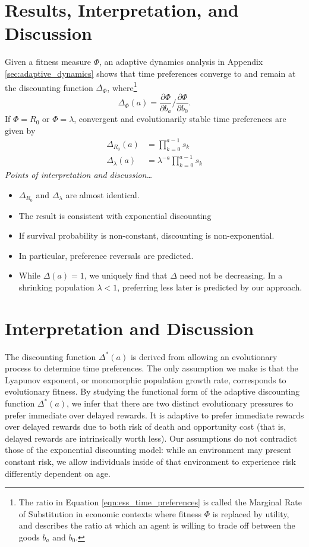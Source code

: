 \documentclass[titlepage, hidelinks, 12pt]{article}
\theoremstyle{plain}
\theoremstyle{remark}
\theoremstyle{definition}
\begin{document}
\section{Results, Interpretation, and Discussion} \label{sec:r, i, and d}
Given a fitness measure $\Phi$,
an adaptive dynamics analysis in Appendix \ref{sec:adaptive_dynamics} shows that time preferences converge to and
remain at the discounting function $\Delta_\Phi$, where\footnote{The ratio in Equation \ref{eqn:ess_time_preferences} is 
    called the Marginal Rate of Substitution in economic contexts where fitness $\Phi$ is replaced
by utility, and describes the ratio at which an agent is willing to trade off between the goods $b_a$ and $b_0$.}
\begin{equation}
    \Delta_\Phi(a) = \frac{\partial \Phi}{\partial b_a} \bigg/ \frac{\partial \Phi}{ \partial b_0}.
    \label{eqn:ess_time_preferences}
\end{equation}
If $\Phi = R_0$ or $\Phi = \lambda$, convergent and evolutionarily stable time preferences are given by
\begin{align}
    \Delta_{R_0}(a) &= \prod_{k = 0}^{a-1} s_k \\ 
    \Delta_{\lambda}(a) &= \lambda^{-a}\prod_{k = 0}^{a-1} s_k
\end{align}
\textit{Points of interpretation and discussion\dots}
\begin{itemize}
    \item $\Delta_{R_0}$ and $\Delta_\lambda$ are almost identical.
    \item The result is consistent with exponential discounting
    \item If survival probability is non-constant, discounting is non-exponential.
    \item In particular, preference reversals are predicted. 
    \item While $\Delta(a) = 1$, we uniquely find that $\Delta$ need not be decreasing. In a shrinking population $\lambda < 1$, 
        preferring less later is predicted by our approach. 
\end{itemize}





\section{Interpretation and Discussion}

The discounting function $\Delta^*(a)$ is derived from allowing an evolutionary process to determine time preferences. The only assumption
we make is that the Lyapunov exponent, or monomorphic population growth rate, corresponds to evolutionary fitness. By studying
the functional form of the adaptive discounting function $\Delta^*(a)$, we infer that there are two distinct evolutionary pressures to prefer
immediate over delayed rewards. It is adaptive to prefer immediate rewards over delayed rewards due to both
risk of death and opportunity cost (that is, delayed rewards are intrinsically worth less). Our assumptions do not contradict those
of the exponential discounting model: while an environment may present constant risk, we allow individuals inside of that environment to experience
risk differently dependent on age. 
\end{document}
